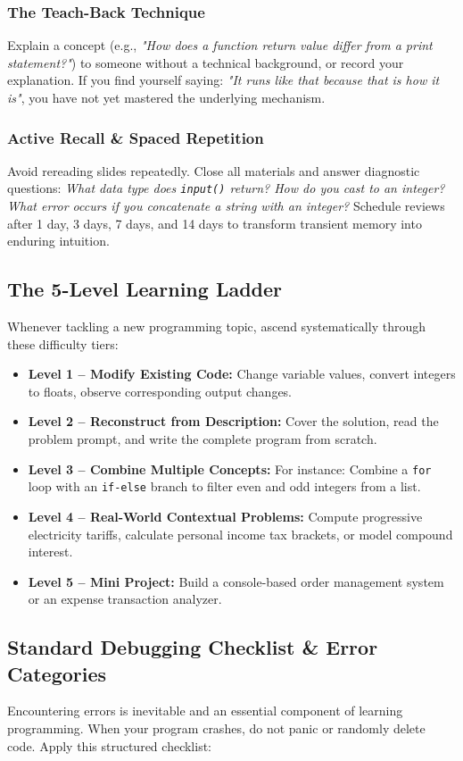 \documentclass[11pt,a4paper]{article}
\begin{document}
\subsubsection{The Teach-Back Technique}
Explain a concept (e.g., \textit{"How does a function return value differ from a print statement?"}) to someone without a technical background, or record your explanation. If you find yourself saying: \textit{"It runs like that because that is how it is"}, you have not yet mastered the underlying mechanism.

\subsubsection{Active Recall \& Spaced Repetition}
Avoid rereading slides repeatedly. Close all materials and answer diagnostic questions: \textit{What data type does \texttt{input()} return? How do you cast to an integer? What error occurs if you concatenate a string with an integer?} Schedule reviews after 1 day, 3 days, 7 days, and 14 days to transform transient memory into enduring intuition.

\subsection{The 5-Level Learning Ladder}
Whenever tackling a new programming topic, ascend systematically through these difficulty tiers:
\begin{itemize}[leftmargin=1.5em, itemsep=3pt]
    \item \textbf{Level 1 -- Modify Existing Code:} Change variable values, convert integers to floats, observe corresponding output changes.
    \item \textbf{Level 2 -- Reconstruct from Description:} Cover the solution, read the problem prompt, and write the complete program from scratch.
    \item \textbf{Level 3 -- Combine Multiple Concepts:} For instance: Combine a \texttt{for} loop with an \texttt{if-else} branch to filter even and odd integers from a list.
    \item \textbf{Level 4 -- Real-World Contextual Problems:} Compute progressive electricity tariffs, calculate personal income tax brackets, or model compound interest.
    \item \textbf{Level 5 -- Mini Project:} Build a console-based order management system or an expense transaction analyzer.
\end{itemize}

\subsection{Standard Debugging Checklist \& Error Categories}
Encountering errors is inevitable and an essential component of learning programming. When your program crashes, do not panic or randomly delete code. Apply this structured checklist:
\end{document}
